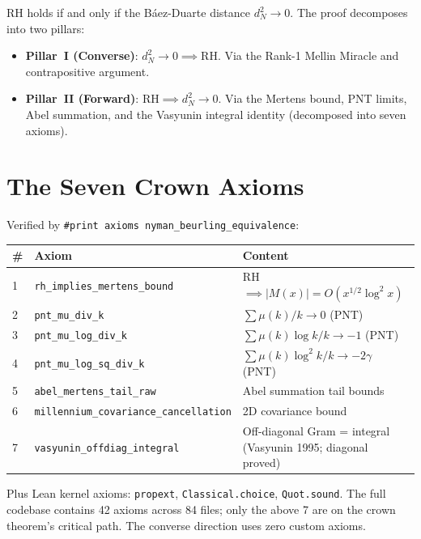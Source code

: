 \documentclass[12pt,a4paper]{article}
\begin{document}
\noindent RH holds if and only if the B\'aez-Duarte distance
$d_N^2 \to 0$. The proof decomposes into two pillars:

\begin{itemize}
\item \textbf{Pillar~I (Converse)}: $d_N^2 \to 0 \implies \mathrm{RH}$.
  Via the Rank-1 Mellin Miracle and contrapositive argument.
\item \textbf{Pillar~II (Forward)}: $\mathrm{RH} \implies d_N^2 \to 0$.
  Via the Mertens bound, PNT limits, Abel summation, and the
  Vasyunin integral identity (decomposed into seven axioms).
\end{itemize}

\section{The Seven Crown Axioms}

Verified by \texttt{\#print axioms nyman\_beurling\_equivalence}:

\begin{table}[h]
\centering
\begin{tabular}{@{}llp{5.5cm}@{}}
\toprule
\textbf{\#} & \textbf{Axiom} & \textbf{Content} \\
\midrule
1 & \texttt{rh\_implies\_mertens\_bound} & RH $\implies |M(x)| = O(x^{1/2}\log^2 x)$ \\
2 & \texttt{pnt\_mu\_div\_k} & $\sum \mu(k)/k \to 0$ (PNT) \\
3 & \texttt{pnt\_mu\_log\_div\_k} & $\sum \mu(k)\log k/k \to -1$ (PNT) \\
4 & \texttt{pnt\_mu\_log\_sq\_div\_k} & $\sum \mu(k)\log^2 k/k \to -2\gamma$ (PNT) \\
5 & \texttt{abel\_mertens\_tail\_raw} & Abel summation tail bounds \\
6 & \texttt{millennium\_covariance\_cancellation} & 2D covariance bound \\
7 & \texttt{vasyunin\_offdiag\_integral} & Off-diagonal Gram = integral (Vasyunin 1995; diagonal proved) \\
\bottomrule
\end{tabular}
\end{table}

\noindent Plus Lean kernel axioms: \texttt{propext}, \texttt{Classical.choice}, \texttt{Quot.sound}.
\noindent The full codebase contains 42 axioms across 84 files; only the above 7 are
on the crown theorem's critical path. The converse direction uses zero custom axioms.
\end{document}
